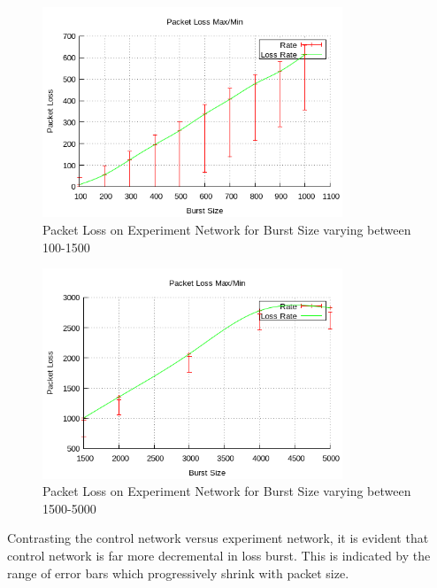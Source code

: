 \documentclass[11pt]{article}
\begin{document}
\FloatBarrier
\begin{figure}[!ht]
\centering
\includegraphics[width=0.8\textwidth]{Fig3.png}
\caption{Packet Loss on Experiment Network for Burst Size varying between 100-1500}
\end{figure}
\FloatBarrier
\begin{figure}[!ht]
\centering
\includegraphics[width=0.8\textwidth]{Fig4.png}
\caption{Packet Loss on Experiment Network for Burst Size varying between 1500-5000}
\end{figure}
\FloatBarrier
Contrasting the control network versus experiment network, it is evident that control network is far more decremental in loss burst. This is indicated by the range of error bars which progressively shrink with packet size.
\end{document}
